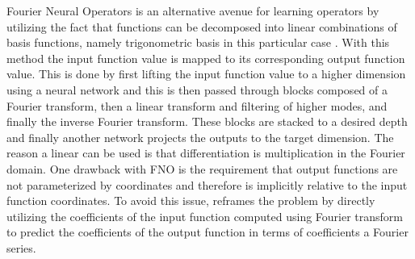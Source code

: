 Fourier Neural Operators is an alternative avenue for learning operators by utilizing the fact that functions can be decomposed into linear combinations of basis functions, namely trigonometric basis in this particular case \autocite{li2021fourier}. With this method the input function value is mapped to its corresponding output function value. This is done by first lifting the input function value to a higher dimension using a neural network and this is then passed through blocks composed of a Fourier transform, then a linear transform and filtering of higher modes, and finally the inverse Fourier transform. These blocks are stacked to a desired depth and finally another network projects the outputs to the target dimension. The reason a linear can be used is that differentiation is multiplication in the Fourier domain. One drawback with FNO is the requirement that output functions are not parameterized by coordinates and therefore is implicitly relative to the input function coordinates. To avoid this issue, \textcite{fanaskovSpectralNeuralOperators2023} reframes the problem by directly utilizing the coefficients of the input function computed using Fourier transform to predict the coefficients of the output function in terms of coefficients a Fourier series.

